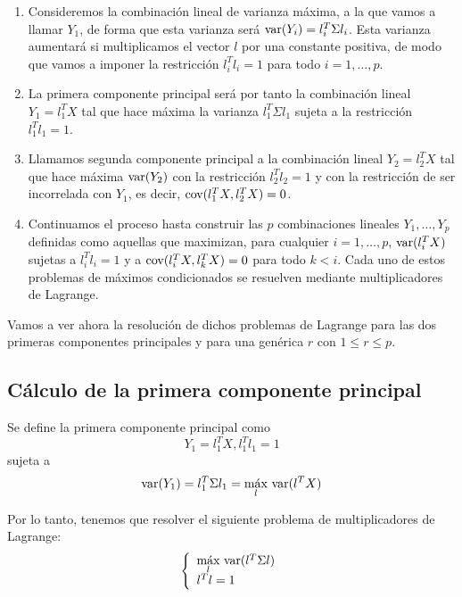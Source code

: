 \begin{enumerate}
\item Consideremos la combinación lineal de varianza máxima, a la que vamos a llamar $Y_1$, de forma que esta varianza será $\text{var}{(Y_i)}=l_i^T \Sigma l_i$. Esta varianza aumentará si multiplicamos el vector $l$ por una constante positiva, de modo que vamos a imponer la restricción $l_i^Tl_i = 1$ para todo $i=1, \dots, p$.
\item La primera componente principal será por tanto la combinación lineal $Y_1 = l_1^TX$ tal que hace máxima la varianza $l_1^T \Sigma l_1$ sujeta a la restricción $l_1^Tl_1 = 1$.
\item Llamamos segunda componente principal a la combinación lineal $Y_2 = l_2^TX$ tal que hace máxima $\text{var}{(Y_2)}$ con la restricción $l_2^Tl_2 = 1$ y con la restricción de ser incorrelada con $Y_1$, es decir, $\text{cov}{(l_1^TX, l_2^TX)} = 0$.
\item Continuamos el proceso hasta construir las $p$ combinaciones lineales $Y_1, \dots, Y_p$ definidas como aquellas que maximizan, para cualquier $i=1, \dots, p$, $\text{var}{(l_i^TX)}$ sujetas a $l_i^Tl_i = 1$ y a $\text{cov}{(l_i^TX, l_k^TX)} = 0$ para todo $k < i$. Cada uno de estos problemas de máximos condicionados se resuelven mediante multiplicadores de Lagrange.
\end{enumerate}

Vamos a ver ahora la resolución de dichos problemas de Lagrange para las dos primeras componentes principales y para una genérica $r$ con $ 1 \leq r \leq p$.

\subsection{Cálculo de la primera componente principal}

Se define la primera componente principal como 
\[	Y_1 = l_1^TX, l_1^Tl_1 = 1	\]
sujeta a 
\[	\text{var}{(Y_1)} = l_1^T\Sigma l_1 = \underset{l}{\text{máx}}\ \text{var}{(l^TX)}	\]

Por lo tanto, tenemos que resolver el siguiente problema de multiplicadores de Lagrange:
\begin{equation*}
  \left\lbrace
  \begin{array}{l}
     \underset{l}{\text{máx}}\ \text{var}{(l^T\Sigma l)} \\
     l^Tl=1 \\
  \end{array}
  \right.
\end{equation*}

